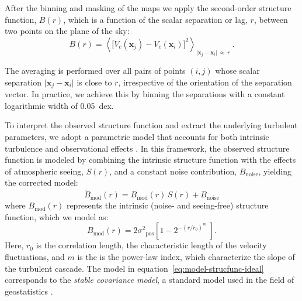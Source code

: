 \documentclass[fleqn,usenatbib, useAMS, a4paper]{mnras}
\newcommand\pos{\ensuremath{_{\mathrm{pos}}}}
\newcommand\noise{\ensuremath{_{\text{noise}}}}
\newcommand\model{\ensuremath{_{\mathrm{mod}}}}
\newcommand\xx{\ensuremath{\boldsymbol{x}}}
\begin{document}
 
After the binning and masking of the maps we apply the second-order structure function, \(B(r)\), which is a function of the scalar separation or lag, \(r\),
between two points on the plane of the sky:
%
\newcommand\Abs[1]{\vert #1\vert}
\begin{equation}\label{eq:Br}
  B(r) = \left\langle 
  \bigl[
  V_{c}(\xx_j) - V_{c}(\xx_i)
  \bigr]^{2} \right \rangle_{\Abs{\xx_j - \xx_i\!} \ \approx \ r} \ .
\end{equation}

The averaging is performed over all pairs of points
\((i, j)\)
whose scalar separation \(\Abs{\xx_j - \xx_i}\) is close to \(r\),
irrespective of the orientation of the separation vector.
In practice, we achieve this by binning the separations with a constant
logarithmic width of \qty{0.05}{dex}.

%
%

To interpret the observed structure function and extract the underlying turbulent parameters, we adopt a parametric model that accounts for both intrinsic turbulence and observational effects \citep{garciav23}. 
In this framework, the observed structure function is modeled by combining the intrinsic structure function with the effects of atmospheric seeing, \(S(r)\), and a constant noise contribution, \(B\noise\), yielding the corrected model:
%
\begin{equation}
  \tilde{B}\model(r) = B\model(r) \,  S(r) + B\noise
  \label{eq:sf-functional}
\end{equation}
where \(B\model(r)\) represents the intrinsic (noise- and seeing-free) structure function, which we model as:
%
\begin{equation}
  \label{eq:model-strucfunc-ideal}
  B\model(r) = 2\sigma^2\pos \left[
    1 - 2^{- \left( r/r_0 \right)^m} \ 
  \right] .
\end{equation}
%
Here, \(r_0\) is the correlation length, the characteristic length of the velocity fluctuations, and \(m\) is the is the power-law index, which characterize the slope of the turbulent cascade.
The model in equation~\eqref{eq:model-strucfunc-ideal} corresponds to the \textit{stable covariance model}, a standard model used in the field of geostatistics \citep{wackernagel2003multivariate}.
\end{document}
